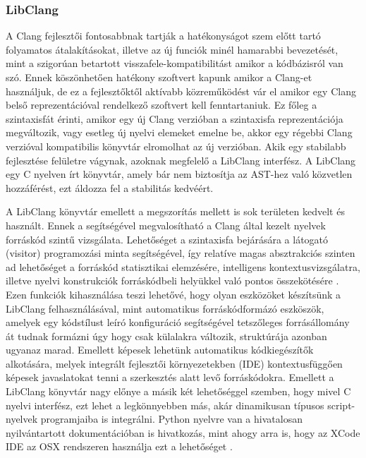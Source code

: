 \documentclass[a4paper,12pt]{report}
\begin{document}
\subsubsection{LibClang}
A Clang fejlesztői fontosabbnak tartják a hatékonyságot szem előtt tartó folyamatos átalakításokat, illetve az új funciók minél hamarabbi bevezetését, mint a szigorúan betartott visszafele-kompatibilitást amikor a kódbázisról van szó. Ennek köszönhetően hatékony szoftvert kapunk amikor a Clang-et használjuk, de ez a fejlesztőktől aktívabb közreműködést vár el amikor egy Clang belső reprezentációval rendelkező szoftvert kell fenntartaniuk. Ez főleg a szintaxisfát érinti, amikor egy új Clang verzióban a szintaxisfa reprezentációja megváltozik, vagy esetleg új nyelvi elemeket emelne be, akkor egy régebbi Clang verzióval kompatibilis könyvtár elromolhat az új verzióban. Akik egy stabilabb fejlesztése felületre vágynak, azoknak megfelelő a LibClang interfész. A LibClang egy C nyelven írt könyvtár, amely bár nem biztosítja az AST-hez való közvetlen  hozzáférést, ezt áldozza fel a stabilitás kedvéért.

A LibClang könyvtár emellett a megszorítás mellett is sok területen kedvelt és használt. Ennek a segítségével megvalosítható a Clang által kezelt nyelvek forráskód szintű vizsgálata. Lehetőséget a szintaxisfa bejárására a látogató (visitor) programozási minta segítségével, így relatíve magas absztrakciós szinten ad lehetőséget a forráskód statisztikai elemzésére, intelligens kontextusvizsgálatra, illetve nyelvi konstrukciók forráskódbeli helyükkel való pontos összekötésére \cite{libclangdocs}. Ezen funkciók kihasználása teszi lehetővé, hogy olyan eszközöket készítsünk a LibClang felhasználásával, mint automatikus forráskódformázó eszköszök, amelyek egy kódstílust leíró konfiguráció segítségével tetszőleges forrásállomány át tudnak formázni úgy hogy csak külalakra változik, struktúrája azonban ugyanaz marad. Emellett képesek lehetünk automatikus kódkiegészítők alkotására, melyek integrált fejlesztői környezetekben (IDE) kontextusfüggően képesek javaslatokat tenni a szerkesztés alatt levő forráskódokra. Emellett a LibClang könyvtár nagy előnye a másik két lehetőséggel szemben, hogy mivel C nyelvi interfész, ezt lehet a legkönnyebben más, akár dinamikusan típusos script-nyelvek programjaiba is integrálni. Python nyelvre van a hivatalosan nyilvántartott dokumentációban is hivatkozás, mint ahogy arra is, hogy az XCode IDE az OSX rendszeren használja ezt a lehetőséget \cite{clangtooling}.
\end{document}
